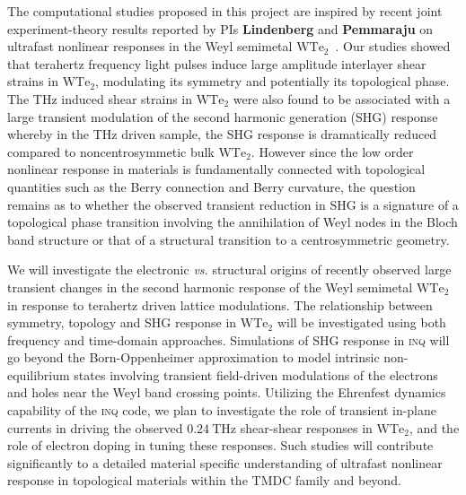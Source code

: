 The computational studies proposed in this project are inspired by recent joint experiment-theory results reported by PIs {\bf Lindenberg} and {\bf Pemmaraju} on ultrafast nonlinear responses in the Weyl semimetal \(\mathrm{WTe_2}\)~\cite{Xiao_2020}. 
Our studies showed that terahertz frequency light pulses induce large amplitude interlayer shear strains in \(\mathrm{WTe_2}\), modulating its symmetry and potentially its topological phase. 
The THz induced shear strains in \(\mathrm{WTe_2}\) were also found to be associated with a large transient modulation of the second harmonic generation (SHG) response whereby in the THz driven sample, the SHG response is dramatically reduced compared to noncentrosymmetic bulk \(\mathrm{WTe_2}\). 
However since the low order nonlinear response in materials is fundamentally connected with topological quantities such as the Berry connection and Berry curvature, the question remains as to whether the observed transient reduction in SHG is a signature of a topological phase transition involving the annihilation of Weyl nodes in the Bloch band structure or that of a structural transition to a centrosymmetric geometry.

We will investigate the electronic \emph{vs.} structural origins of recently observed large transient changes in the second harmonic response of the Weyl semimetal \(\mathrm{WTe_2}\) in response to terahertz driven lattice modulations.
The relationship between symmetry, topology and SHG response in \(\mathrm{WTe_2}\) will be investigated using both frequency and time-domain approaches. Simulations of SHG response in \textsc{inq} will go beyond the Born-Oppenheimer approximation to model intrinsic non-equilibrium states involving transient field-driven modulations of the electrons and holes near the Weyl band crossing points.
Utilizing the Ehrenfest dynamics capability of the \textsc{inq} code, we plan to investigate the role of transient in-plane currents in driving the observed \(0.24~\mathrm{THz}\) shear-shear responses in \(\mathrm{WTe_2}\), and the role of electron doping in tuning these responses. 
Such studies will contribute significantly to a detailed material specific understanding of ultrafast nonlinear response in topological materials within the TMDC family and beyond.

\clearpage

